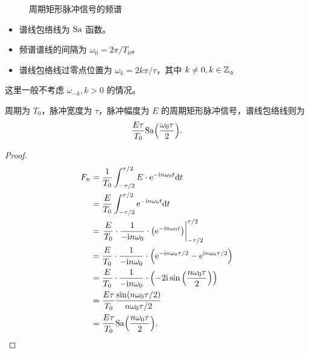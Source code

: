 \begin{example}[周期矩形脉冲信号的傅里叶级数]
\begin{figure}[H]
        \caption{周期矩形脉冲信号的频谱}
        \label{fig:periodic-rect-pulse-signal-freq}
    \end{figure}

    \begin{itemize}
        \item 谱线包络线为 $\mathrm{Sa}$ 函数。
        \item 频谱谱线的间隔为 $\omega_0 = 2\pi / T_0$。
        \item 谱线包络线过零点位置为 $\omega_k = 2k\pi / \tau$，其中 $k \neq 0, k \in \mathbb{Z}$。
    \end{itemize}
\end{example}

\begin{note}
    这里一般不考虑 $\omega_{-k}, k > 0$ 的情况。
\end{note}

\begin{theorem}
    周期为 $T_0$，脉冲宽度为 $\tau$，脉冲幅度为 $E$ 的周期矩形脉冲信号，谱线包络线则为
    \begin{align*}
        \frac{E\tau}{T_0}\mathrm{Sa}{\left(\frac{\omega_0\tau}{2}\right)}.
    \end{align*}
\end{theorem}

\begin{proof}
    \begin{align*}
        F_n & = \frac{1}{T_0}\int_{-\tau/2}^{\tau/2}E\cdot \mathrm{e}^{-\mathrm{i} n\omega_0 t}\mathrm{d}t \\
        & = \frac{E}{T_0}\int_{-\tau/2}^{\tau/2}\mathrm{e}^{-\mathrm{i} n\omega_0 t}\mathrm{d}t \\
        & = \left.\frac{E}{T_0}\cdot\frac{1}{-\mathrm{i} n\omega_0}\cdot\left(\mathrm{e}^{-\mathrm{i} n\omega_0 t}\right)\right|_{-\tau/2}^{\tau/2} \\
        & = \frac{E}{T_0}\cdot\frac{1}{-\mathrm{i} n\omega_0}\cdot\left(\mathrm{e}^{-\mathrm{i} n\omega_0 \tau / 2} - \mathrm{e}^{\mathrm{i} n \omega_0\tau /2 }\right) \\
        & = \frac{E}{T_0}\cdot\frac{1}{-\mathrm{i} n\omega_0}\cdot\left(-2\mathrm{i}\sin\left(\frac{n\omega_0\tau}{2}\right)\right) \\
        & = \frac{E\tau}{T_0}\frac{\sin(n\omega_0\tau/2)}{n\omega_0\tau/2} \\
        & = \frac{E\tau}{T_0}\mathrm{Sa}{\left(\frac{n\omega_0\tau}{2}\right)}.
    \end{align*}
\end{proof}

